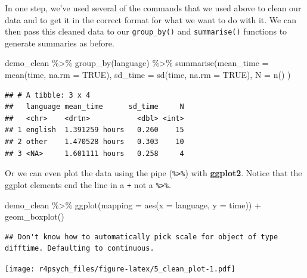 \documentclass[
]{book}
\newenvironment{Shaded}{\begin{snugshade}}{\end{snugshade}}
\newcommand{\AttributeTok}[1]{\textcolor[rgb]{0.77,0.63,0.00}{#1}}
\newcommand{\ConstantTok}[1]{\textcolor[rgb]{0.00,0.00,0.00}{#1}}
\newcommand{\FunctionTok}[1]{\textcolor[rgb]{0.00,0.00,0.00}{#1}}
\newcommand{\NormalTok}[1]{#1}
\newcommand{\SpecialCharTok}[1]{\textcolor[rgb]{0.00,0.00,0.00}{#1}}
\begin{document}
In one step, we've used several of the commands that we used above to clean our data and to get it in the correct format for what we want to do with it. We can then pass this cleaned data to our \texttt{group\_by()} and \texttt{summarise()} functions to generate summaries as before.

\begin{Shaded}
\begin{Highlighting}[]
\NormalTok{demo\_clean }\SpecialCharTok{\%\textgreater{}\%}
  \FunctionTok{group\_by}\NormalTok{(language) }\SpecialCharTok{\%\textgreater{}\%}
  \FunctionTok{summarise}\NormalTok{(}\AttributeTok{mean\_time =} \FunctionTok{mean}\NormalTok{(time, }\AttributeTok{na.rm =} \ConstantTok{TRUE}\NormalTok{),}
           \AttributeTok{sd\_time =} \FunctionTok{sd}\NormalTok{(time, }\AttributeTok{na.rm =} \ConstantTok{TRUE}\NormalTok{),}
           \AttributeTok{N =} \FunctionTok{n}\NormalTok{()}
\NormalTok{           )}
\end{Highlighting}
\end{Shaded}

\begin{verbatim}
## # A tibble: 3 x 4
##   language mean_time      sd_time     N
##   <chr>    <drtn>           <dbl> <int>
## 1 english  1.391259 hours   0.260    15
## 2 other    1.470528 hours   0.303    10
## 3 <NA>     1.601111 hours   0.258     4
\end{verbatim}

Or we can even plot the data using the pipe (\texttt{\%\textgreater{}\%}) with \textbf{ggplot2}. Notice that the ggplot elements end the line in a \texttt{+} not a \texttt{\%\textgreater{}\%}.

\begin{Shaded}
\begin{Highlighting}[]
\NormalTok{demo\_clean }\SpecialCharTok{\%\textgreater{}\%}
  \FunctionTok{ggplot}\NormalTok{(}\AttributeTok{mapping =} \FunctionTok{aes}\NormalTok{(}\AttributeTok{x =}\NormalTok{ language, }\AttributeTok{y =}\NormalTok{ time)) }\SpecialCharTok{+} 
  \FunctionTok{geom\_boxplot}\NormalTok{()}
\end{Highlighting}
\end{Shaded}

\begin{verbatim}
## Don't know how to automatically pick scale for object of type difftime. Defaulting to continuous.
\end{verbatim}

\texttt{[image: r4psych\_files/figure-latex/5\_clean\_plot-1.pdf]}
\end{document}
